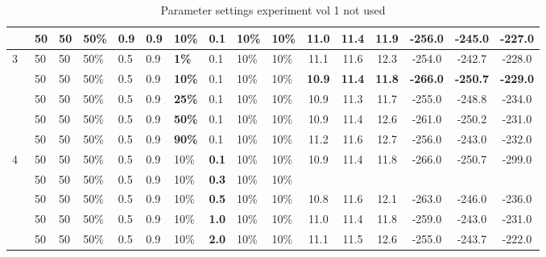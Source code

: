 \begin{sidewaystable}
\begin{tabular}{|l|l|l|l|l|l|l|l|l|l||c|c|c|c|c|c|}
    ~ & 50 & 50 & 50\% & \textbf{0.9} & \textbf{0.9} & 10\% & 0.1 & 10\% & 10\% &  11.0 & 11.4 & 11.9 & -256.0 & -245.0 & -227.0  \\
    \hline
    3 & 50 & 50 & 50\% & 0.5 & 0.9 & \textbf{1\%} & 0.1 & 10\% & 10\% & 11.1 & 11.6 & 12.3 & -254.0 & -242.7 & -228.0  \\
    ~ & 50 & 50 & 50\% & 0.5 & 0.9 & \textbf{10\%} & 0.1 & 10\% & 10\% &  \textbf{10.9} & \textbf{11.4} & \textbf{11.8} & \textbf{-266.0} & \textbf{-250.7} & \textbf{-229.0} \\\
    ~ & 50 & 50 & 50\% & 0.5 & 0.9 & \textbf{25\%} & 0.1 & 10\% & 10\% &  10.9 & 11.3 & 11.7 & -255.0 & -248.8 & -234.0 \\
    ~ & 50 & 50 & 50\% & 0.5 & 0.9 & \textbf{50\%} & 0.1 & 10\% & 10\% &  10.9 & 11.4 & 12.6 & -261.0 & -250.2 & -231.0 \\
    ~ & 50 & 50 & 50\% & 0.5 & 0.9 & \textbf{90\%} & 0.1 & 10\% & 10\% &  11.2 & 11.6 & 12.7 & -256.0 & -243.0 & -232.0 \\
    \hline
    4 & 50 & 50 & 50\% & 0.5 & 0.9 & 10\% & \textbf{0.1} & 10\% & 10\% & 10.9 & 11.4 & 11.8 & -266.0 & -250.7 & -299.0  \\
    ~ & 50 & 50 & 50\% & 0.5 & 0.9 & 10\% & \textbf{0.3} & 10\% & 10\% & ~ & ~ & ~ & ~ & ~ & ~ \\
    ~ & 50 & 50 & 50\% & 0.5 & 0.9 & 10\% & \textbf{0.5} & 10\% & 10\% & 10.8 & 11.6 & 12.1 & -263.0 & -246.0 & -236.0  \\
    ~ & 50 & 50 & 50\% & 0.5 & 0.9 & 10\% & \textbf{1.0} & 10\% & 10\% & 11.0 & 11.4 & 11.8 & -259.0 & -243.0 & -231.0  \\
    ~ & 50 & 50 & 50\% & 0.5 & 0.9 & 10\% & \textbf{2.0} & 10\% & 10\% & 11.1 & 11.5 & 12.6 & -255.0 & -243.7 & -222.0  \\
    \hline
    \end{tabular}
    \caption {Parameter settings experiment vol 1 not used}

    \label{table:pmsNotUsed}
\end{sidewaystable}

